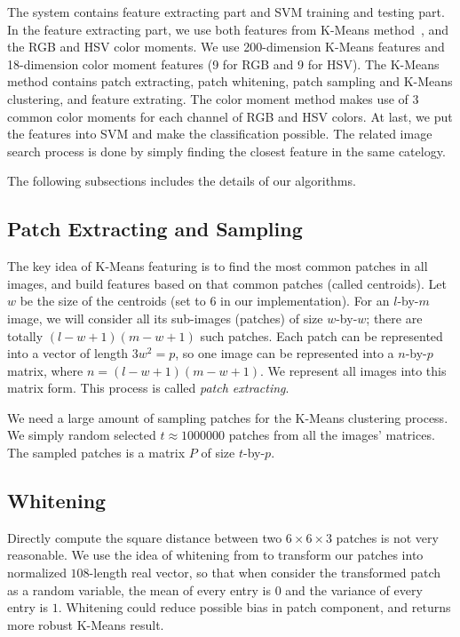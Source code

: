 \documentclass{acm_proc_article-sp}
\begin{document}
The system contains feature extracting part and SVM training and testing part.
In the feature extracting part,
    we use both features from K-Means method~\cite{coates2011analysis},
    and the RGB and HSV color moments.
We use 200-dimension K-Means features and 18-dimension color moment
features (9 for RGB and 9 for HSV).
The K-Means method contains patch extracting, patch whitening,
    patch sampling and K-Means clustering,
    and feature extrating.
The color moment method makes use of 3 common color moments for 
    each channel of RGB and HSV colors.
At last, we put the features into SVM and make the classification possible.
The related image search process is done by simply finding
    the closest feature in the same catelogy.

The following subsections includes the details of our algorithms.

\subsection{Patch Extracting and Sampling}

The key idea of K-Means featuring is to find the most common
    patches in all images, and build features based on that
    common patches (called centroids).
Let $w$ be the size of the centroids (set to $6$ in our implementation).
For an $l$-by-$m$ image,
we will consider all its sub-images (patches) of size $w$-by-$w$;
there are totally $(l-w+1)(m-w+1)$ such patches.
Each patch can be represented into a vector of length $3w^2 = p$,
    so one image can be represented into a $n$-by-$p$ matrix,
    where $n=(l-w+1)(m-w+1)$.
We represent all images into this matrix form.
This process is called \emph{patch extracting}.

We need a large amount of sampling patches for the K-Means clustering process.
We simply random selected $t\approx 1000000$ patches
    from all the images' matrices.
The sampled patches is a matrix $P$ of size $t$-by-$p$.

\subsection{Whitening}

Directly compute the square distance between two $6\times 6\times 3$ patches is not
very reasonable. We use the idea of whitening from \cite{coates2011analysis} to
transform our patches into normalized $108$-length real vector, so that when
consider the transformed patch as a random variable, the mean of every entry
is $0$ and the variance of every entry is $1$. Whitening could reduce possible
bias in patch component, and returns more robust K-Means result.
\end{document}

